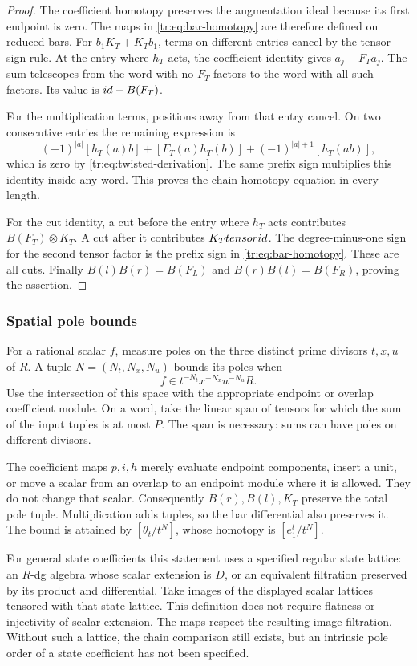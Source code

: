 \begin{proof}
The coefficient homotopy preserves the augmentation ideal because
its first endpoint is zero.  The maps in
\eqref{tr:eq:bar-homotopy} are therefore defined on reduced bars.
For \(b_1K_T+K_Tb_1\), terms on different entries cancel by
the tensor sign rule.  At the entry where \(h_T\) acts, the coefficient
identity gives \(a_j-F_Ta_j\).  The sum telescopes from the
word with no \(F_T\) factors to the word with all such factors.
Its value is \(id-B(F_T)\).

For the multiplication terms, positions away from that entry
cancel.  On two consecutive entries the remaining expression is
\[
 (-1)^{|a|}[h_T(a)b]+[F_T(a)h_T(b)]
       +(-1)^{|a|+1}[h_T(ab)],
\]
which is zero by \eqref{tr:eq:twisted-derivation}.  The same
prefix sign multiplies this identity inside any word.  This proves
the chain homotopy equation in every length.

For the cut identity, a cut before the entry where \(h_T\) acts contributes
\(B(F_T)\otimes K_T\).  A cut after it contributes
\(K_Ttensorid\).  The degree-minus-one sign for the
second tensor factor is the prefix sign in
\eqref{tr:eq:bar-homotopy}.  These are all cuts.  Finally
\(B(l)B(r)=B(F_L)\) and \(B(r)B(l)=B(F_R)\), proving
the assertion.
\end{proof}

\subsubsection{Spatial pole bounds}

For a rational scalar \(f\), measure poles on the three distinct
prime divisors \(t,x,u\) of \(R\).  A tuple
\(N=(N_t,N_x,N_u)\) bounds its poles when
\[
 f\in t^{-N_t}x^{-N_x}u^{-N_u}R.
\]
Use the intersection of this space with the appropriate endpoint
or overlap coefficient module.  On a word, take the linear span of
tensors for which the sum of the input tuples is at most \(P\).
The span is necessary: sums can have poles on different divisors.

The coefficient maps \(p,i,h\) merely evaluate endpoint
components, insert a unit, or move a scalar from an overlap to an
endpoint module where it is allowed.  They do not change that scalar.
Consequently \(B(r),B(l),K_T\) preserve the total pole tuple.
Multiplication adds tuples, so the bar differential also preserves it.
The bound is attained by \([\theta_t/t^N]\), whose homotopy
is \([e_1^t/t^N]\).

For general state coefficients this statement uses a specified
regular state lattice: an \(R\)-dg algebra whose scalar extension
is \(D\), or an equivalent filtration preserved by its product
and differential.  Take images of the displayed scalar lattices
tensored with that state lattice.  This definition does not require
flatness or injectivity of scalar extension.  The maps respect the
resulting image filtration.  Without such a lattice, the chain
comparison still exists, but an intrinsic pole order of a state
coefficient has not been specified.

